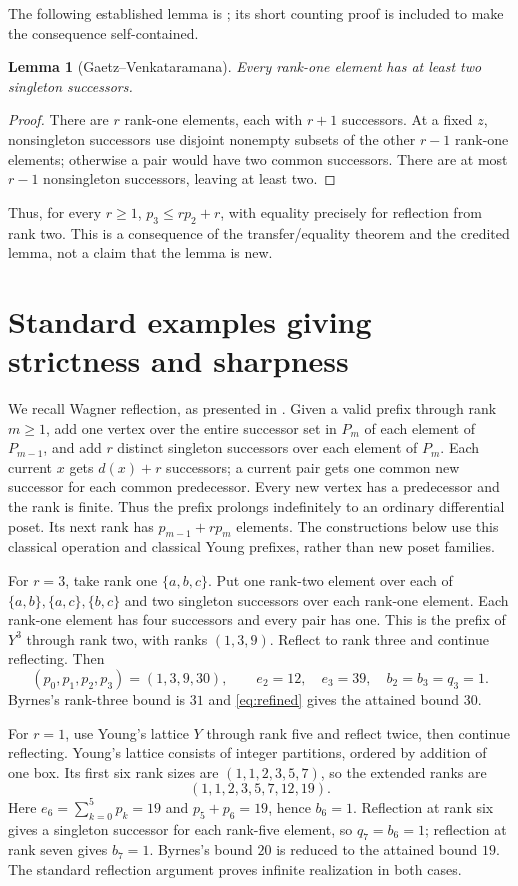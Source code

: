 \documentclass[11pt]{article}
\newtheorem{lemma}[theorem]{Lemma}
\theoremstyle{remark}
\begin{document}
The following established lemma is \cite[Proposition~3.4]{GV}; its short
counting proof is included to make the consequence self-contained.
\begin{lemma}[Gaetz--Venkataramana]\label{lem:rankone}
Every rank-one element has at least two singleton successors.
\end{lemma}
\begin{proof}
There are $r$ rank-one elements, each with $r+1$ successors. At a fixed $z$,
nonsingleton successors use disjoint nonempty subsets of the other $r-1$
rank-one elements; otherwise a pair would have two common successors.
There are at most $r-1$ nonsingleton successors, leaving at least two.
\end{proof}
Thus, for every $r\ge1$, $p_3\le rp_2+r$, with equality precisely for reflection
from rank two. This is a consequence of the transfer/equality theorem and
the credited lemma, not a claim that the lemma is new.

\newpage
\section{Standard examples giving strictness and sharpness}\label{sec:sharp}
We recall Wagner reflection, as presented in \cite[Proposition~6.1 and the
following paragraph]{Stanley}. Given a valid prefix through rank $m\ge1$,
add one vertex over the entire successor set in $P_m$ of each element of
$P_{m-1}$, and add $r$ distinct singleton successors over each element of
$P_m$. Each current $x$ gets $d(x)+r$ successors; a current pair gets one
common new successor for each common predecessor. Every new vertex has
a predecessor and the rank is finite. Thus the prefix prolongs indefinitely
to an ordinary differential poset. Its next rank has $p_{m-1}+rp_m$ elements.
The constructions below use this classical operation and classical Young
prefixes, rather than new poset families.

For $r=3$, take rank one $\{a,b,c\}$. Put one rank-two element over each of
$\{a,b\},\{a,c\},\{b,c\}$ and two singleton successors over each rank-one
element. Each rank-one element has four successors and every pair has one.
This is the prefix of $Y^3$ through rank two, with ranks $(1,3,9)$.
Reflect to rank three and continue reflecting. Then
\[
 (p_0,p_1,p_2,p_3)=(1,3,9,30),\qquad
 e_2=12,\quad e_3=39,\quad b_2=b_3=q_3=1.
\]
Byrnes's rank-three bound is $31$ and \eqref{eq:refined} gives the attained
bound $30$.

For $r=1$, use Young's lattice $Y$ through rank five and reflect twice,
then continue reflecting. Young's lattice consists of integer partitions,
ordered by addition of one box. Its first six rank sizes are
$(1,1,2,3,5,7)$, so the extended ranks are
\[
 (1,1,2,3,5,7,12,19).
\]
Here $e_6=\sum_{k=0}^5p_k=19$ and $p_5+p_6=19$, hence $b_6=1$.
Reflection at rank six gives a singleton successor for each rank-five element,
so $q_7=b_6=1$; reflection at rank seven gives $b_7=1$.
Byrnes's bound $20$ is reduced to the attained bound $19$.
The standard reflection argument proves infinite realization in both cases.
\end{document}
